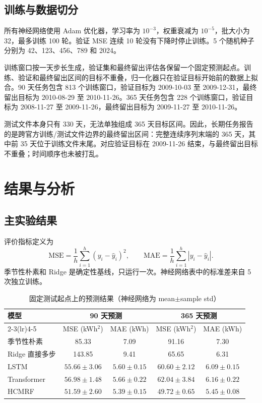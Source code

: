 \documentclass[11pt,a4paper]{article}
\begin{document}
\subsection{训练与数据切分}

所有神经网络使用 Adam 优化器，学习率为 $10^{-3}$，权重衰减为 $10^{-5}$，批大小为 32，最多训练 100 轮。验证 MSE 连续 10 轮没有下降时停止训练。5 个随机种子分别为 42、123、456、789 和 2024。

训练窗口按一天步长生成，验证集和最终留出评估各保留一个固定预测起点。训练、验证和最终留出区间的目标不重叠，归一化器只在验证目标开始前的数据上拟合。90 天任务包含 813 个训练窗口，验证目标为 2009-10-03 至 2009-12-31，最终留出目标为 2010-08-29 至 2010-11-26。365 天任务包含 228 个训练窗口，验证目标为 2008-11-27 至 2009-11-26，最终留出目标为 2009-11-27 至 2010-11-26。

测试文件本身只有 330 天，无法单独组成 365 天目标区间。因此，长期任务报告的是跨官方训练/测试文件边界的最终留出区间：完整连续序列末端的 365 天，其中前 35 天位于训练文件末尾。对应验证目标在 2009-11-26 结束，与最终留出目标不重叠；时间顺序也未被打乱\cite{tashman,hyndman_tscv}。

\section{结果与分析}

\subsection{主实验结果}

评价指标定义为
\begin{equation}
\mathrm{MSE}=\frac{1}{h}\sum_{i=1}^{h}(y_i-\hat y_i)^2,
\qquad
\mathrm{MAE}=\frac{1}{h}\sum_{i=1}^{h}|y_i-\hat y_i|.
\end{equation}
季节性朴素和 Ridge 是确定性基线，只运行一次。神经网络表中的标准差来自 5 次独立训练。

\begin{table}[H]
\centering
\caption{固定测试起点上的预测结果（神经网络为 mean$\pm$sample std）}
\label{tab:main}
\small
\setlength{\tabcolsep}{4.5pt}
\begin{tabular}{lcccc}
\toprule
模型 & \multicolumn{2}{c}{90 天预测} & \multicolumn{2}{c}{365 天预测} \\
\cmidrule(lr){2-3}\cmidrule(lr){4-5}
 & MSE (kWh$^2$) & MAE (kWh) & MSE (kWh$^2$) & MAE (kWh) \\
\midrule
季节性朴素 & 85.33 & 7.09 & 91.16 & 7.30 \\
Ridge 直接多步 & 143.85 & 9.41 & 65.65 & 6.31 \\
LSTM & $55.66\pm3.06$ & $5.60\pm0.15$ & $60.60\pm2.12$ & $6.09\pm0.15$ \\
Transformer & $56.98\pm1.48$ & $5.66\pm0.22$ & $62.04\pm3.84$ & $6.16\pm0.22$ \\
HCMRF & $\mathbf{51.59\pm2.60}$ & $\mathbf{5.39\pm0.15}$ &
$\mathbf{49.72\pm0.65}$ & $\mathbf{5.45\pm0.08}$ \\
\bottomrule
\end{tabular}
\end{table}
\end{document}
